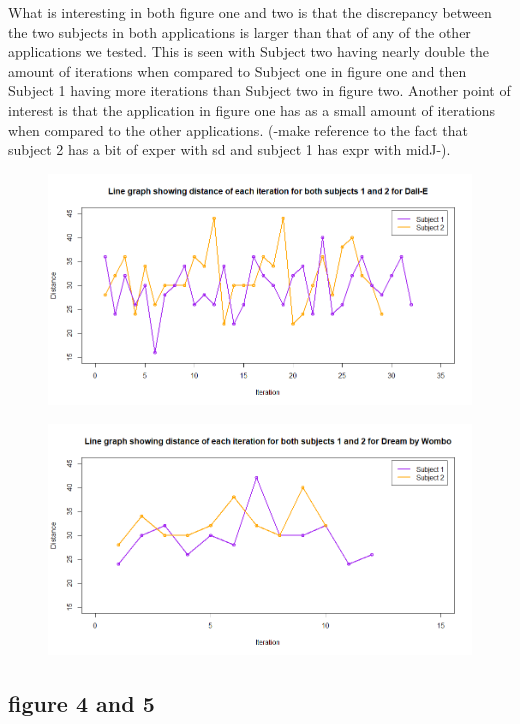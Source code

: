 \documentclass[]{report}
\begin{document}
What is interesting in both figure one and two is that the discrepancy between the two subjects in both applications is larger than that of any of the other applications we tested. This is seen with Subject two having nearly double the amount of iterations when compared to Subject one in figure one and then Subject 1 having more iterations than Subject two in figure two. Another point of interest is that the application in figure one has as a small amount of iterations when compared to the other applications.  (-make reference to the fact that subject 2 has a bit of exper with sd and subject 1 has expr with midJ-).

\begin{figure}[!htbp]
	\centering
	\includegraphics[width=1\linewidth]{LineGraphDall-E}
	\caption{}
	\label{fig:linegraphdall-e}
\end{figure}

\begin{figure}[!htbp]
	\centering
	\includegraphics[width=1\linewidth]{LineGraphDBW}
	\caption{}
	\label{fig:linegraphdbw}
\end{figure}
\subsection{figure 4 and 5}
\end{document}
